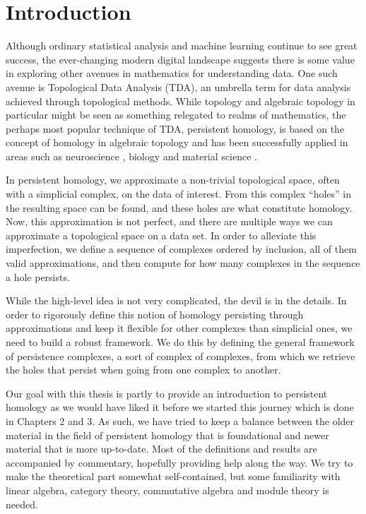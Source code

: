 \chapter{Introduction}
Although ordinary statistical analysis and machine learning continue to see great success, the ever-changing modern digital landscape suggests there is some value in exploring other avenues in mathematics for understanding data. One such avenue is Topological Data Analysis (TDA), an umbrella term for data analysis achieved through topological methods. While topology and algebraic topology in particular might be seen as something relegated to realms of mathematics, the perhaps most popular technique of TDA, persistent homology, is based on the concept of homology in algebraic topology and has been successfully applied in areas such as neuroscience \cite{reimann}, biology \cite{plants} and material science \cite{moon2019}.

In persistent homology, we approximate a non-trivial topological space, often with a simplicial complex, on the data of interest. From this complex ``holes'' in the resulting space can be found, and these holes are what constitute homology. Now, this approximation is not perfect, and there are multiple ways we can approximate a topological space on a data set. In order to alleviate this imperfection, we define a sequence of complexes ordered by inclusion, all of them valid approximations, and then compute for how many complexes in the sequence a hole persists.

While the high-level idea is not very complicated, the devil is in the details. In order to rigorously define this notion of homology persisting through approximations and keep it flexible for other complexes than simplicial ones, we need to build a robust framework. We do this by defining the general framework of persistence complexes, a sort of complex of complexes, from which we retrieve the holes that persist when going from one complex to another.


Our goal with this thesis is partly to provide an introduction to persistent homology as we would have liked it before we started this journey which is done in Chapters 2 and 3. As such, we have tried to keep a balance between the older material in the field of persistent homology that is foundational and newer material that is more up-to-date. Most of the definitions and results are accompanied by commentary, hopefully providing help along the way. We try to make the theoretical part somewhat self-contained, but some familiarity with linear algebra, category theory, commutative algebra and module theory is needed.

